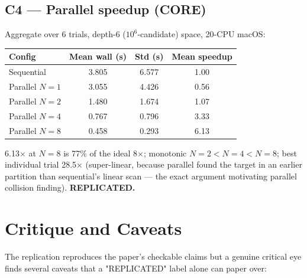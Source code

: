 \documentclass[11pt]{article}
\begin{document}
\subsection*{C4 --- Parallel speedup (CORE)}
Aggregate over 6 trials, depth-6 ($10^6$-candidate) space, 20-CPU macOS:
\begin{center}
\begin{tabular}{lS[table-format=1.3]S[table-format=1.3]S[table-format=1.2]}
\toprule
Config & {Mean wall (s)} & {Std (s)} & {Mean speedup} \\
\midrule
Sequential & 3.805 & 6.577 & 1.00 \\
Parallel $N{=}1$ & 3.055 & 4.426 & 0.56 \\
Parallel $N{=}2$ & 1.480 & 1.674 & 1.07 \\
Parallel $N{=}4$ & 0.767 & 0.796 & 3.33 \\
Parallel $N{=}8$ & 0.458 & 0.293 & 6.13 \\
\bottomrule
\end{tabular}
\end{center}
6.13$\times$ at $N{=}8$ is 77\% of the ideal 8$\times$; monotonic
$N{=}2{<}N{=}4{<}N{=}8$; best individual trial 28.5$\times$
(super-linear, because parallel found the target in an earlier
partition than sequential's linear scan --- the exact argument
motivating parallel collision finding). \textbf{REPLICATED.}

\section{Critique and Caveats}
The replication reproduces the paper's checkable claims but a genuine
critical eye finds several caveats that a "REPLICATED" label alone can
paper over:
\end{document}

